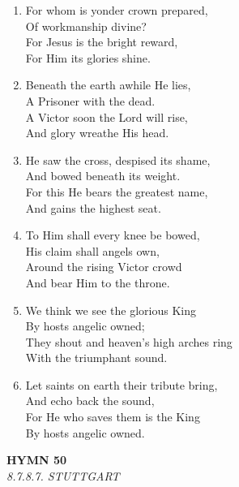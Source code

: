 \begin{enumerate}
    \item For whom is yonder crown prepared, \\
        Of workmanship divine? \\
        For Jesus is the bright reward, \\
        For Him its glories shine.

    \item Beneath the earth awhile He lies, \\
        A Prisoner with the dead. \\
        A Victor soon the Lord will rise, \\
        And glory wreathe His head.

    \item He saw the cross, despised its shame, \\
        And bowed beneath its weight. \\
        For this He bears the greatest name, \\
        And gains the highest seat.

    \item To Him shall every knee be bowed, \\
        His claim shall angels own, \\
        Around the rising Victor crowd \\
        And bear Him to the throne.

    \item We think we see the glorious King \\
        By hosts angelic owned; \\
        They shout and heaven's high arches ring \\
        With the triumphant sound.

    \item Let saints on earth their tribute bring, \\
        And echo back the sound, \\
        For He who saves them is the King \\
        By hosts angelic owned.

\end{enumerate}

\newpage
\begin{center}
    {\Large \textbf{HYMN 50}}
    \\
    \textit{8.7.8.7. STUTTGART}
\end{center}
\vspace{1em}

